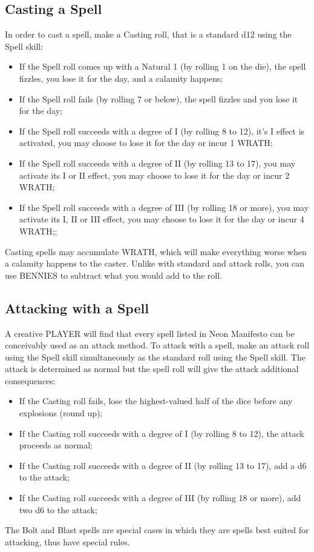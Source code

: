 \subsection{Casting a Spell}
In order to cast a spell, make a Casting roll, that is a standard d12 using the Spell skill:
\begin{itemize}
    \item {If the Spell roll comes up with a Natural 1 (by rolling 1 on the die), the spell fizzles, you lose it for the day, and a calamity happens;}
    \item {If the Spell roll fails (by rolling 7 or below), the spell fizzles and you lose it for the day;}
    \item {If the Spell roll succeeds with a degree of I (by rolling 8 to 12), it's I effect is activated, you may choose to lose it for the day or incur 1 WRATH;}
    \item {If the Spell roll succeeds with a degree of II (by rolling 13 to 17), you may activate its I or II effect, you may choose to lose it for the day or incur 2 WRATH;}
    \item {If the Spell roll succeeds with a degree of III (by rolling 18 or more), you may activate its I, II or III effect, you may choose to lose it for the day or incur 4 WRATH;;}
\end{itemize}
Casting spells may accumulate WRATH, which will make everything worse when a calamity happens to the caster. Unlike with standard and attack rolls, you can use BENNIES to subtract what you would add to the roll.

\subsection{Attacking with a Spell}
A creative PLAYER will find that every spell listed in Neon Manifesto can be conceivably used as an attack method. To attack with a spell, make an attack roll using the Spell skill simultaneously as the standard roll using the Spell skill. The attack is determined as normal but the spell roll will give the attack additional consequences:
\begin{itemize}
    \item {If the Casting roll fails, lose the highest-valued half of the dice before any explosions (round up);}
    \item {If the Casting roll succeeds with a degree of I (by rolling 8 to 12), the attack proceeds as normal;}
    \item {If the Casting roll succeeds with a degree of II (by rolling 13 to 17), add a d6 to the attack;}
    \item {If the Casting roll succeeds with a degree of III (by rolling 18 or more), add two d6 to the attack;}
\end{itemize}
The Bolt and Blast spells are special cases in which they are spells best suited for attacking, thus have special rules.

